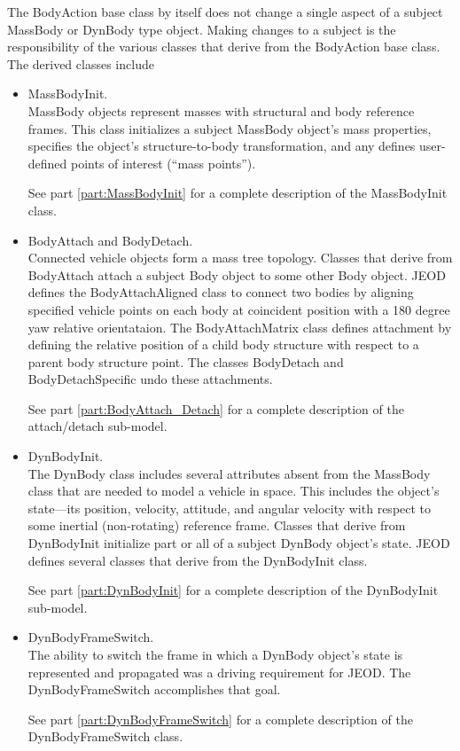 The BodyAction base class by itself does not change a single
aspect of a subject MassBody or DynBody type object. Making changes to a
subject is the responsibility of the various classes that derive from the
BodyAction base class. The derived classes include
\begin{itemize}
\item MassBodyInit. \\
MassBody objects represent masses with structural and body reference frames.
This class initializes a subject MassBody object's mass properties,
specifies the object's structure-to-body transformation, and
any defines user-defined points of interest (``mass points'').

See part \ref{part:MassBodyInit} for a complete description of the
MassBodyInit class.

\item BodyAttach and BodyDetach. \\
Connected vehicle objects form a mass tree topology.
Classes that derive from BodyAttach attach a subject Body object to
some other Body object. JEOD defines the BodyAttachAligned class to connect
two bodies by aligning specified vehicle points on each body at coincident
position with a 180 degree yaw relative orientataion. The BodyAttachMatrix
class defines attachment by defining the relative position of a child body
structure with respect to a parent body structure point.
The classes BodyDetach and BodyDetachSpecific undo
these attachments.

See part \ref{part:BodyAttach_Detach} for a complete description of the
attach/detach sub-model.

\item DynBodyInit. \\
The DynBody class includes several attributes absent from the MassBody class that are
needed to model a vehicle in space. This includes the object's state---its
position, velocity, attitude, and angular velocity with respect to some
inertial (non-rotating) reference frame. Classes that derive from
DynBodyInit initialize part or all of a subject DynBody object's state.
JEOD defines several classes that derive from the DynBodyInit class.

See part \ref{part:DynBodyInit} for a complete description of the
DynBodyInit sub-model.

\item DynBodyFrameSwitch. \\
The ability to switch the frame in which a DynBody object's state is
represented and propagated was a driving requirement for JEOD.
The DynBodyFrameSwitch accomplishes that goal.

See part \ref{part:DynBodyFrameSwitch} for a complete description of the
DynBodyFrameSwitch class.
\end{itemize}

